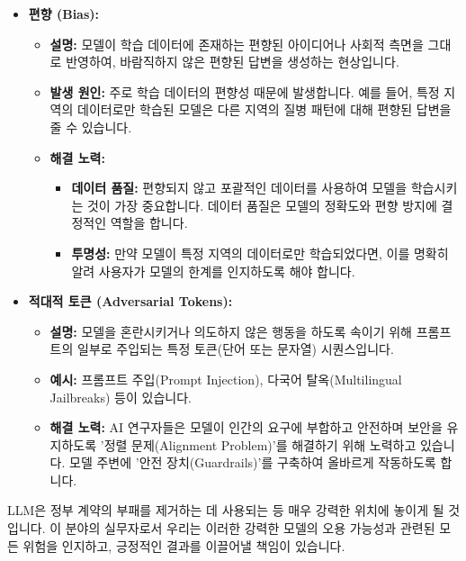 \documentclass[11pt,a4paper]{article}
\theoremstyle{definition}
\begin{document}
\begin{itemize}
    \item \textbf{편향 (Bias):}
    \begin{itemize}
        \item \textbf{설명:} 모델이 학습 데이터에 존재하는 편향된 아이디어나 사회적 측면을 그대로 반영하여, 바람직하지 않은 편향된 답변을 생성하는 현상입니다.
        \item \textbf{발생 원인:} 주로 학습 데이터의 편향성 때문에 발생합니다. 예를 들어, 특정 지역의 데이터로만 학습된 모델은 다른 지역의 질병 패턴에 대해 편향된 답변을 줄 수 있습니다.
        \item \textbf{해결 노력:}
        \begin{itemize}
            \item \textbf{데이터 품질:} 편향되지 않고 포괄적인 데이터를 사용하여 모델을 학습시키는 것이 가장 중요합니다. 데이터 품질은 모델의 정확도와 편향 방지에 결정적인 역할을 합니다.
            \item \textbf{투명성:} 만약 모델이 특정 지역의 데이터로만 학습되었다면, 이를 명확히 알려 사용자가 모델의 한계를 인지하도록 해야 합니다.
        \end{itemize}
    \end{itemize}

    \item \textbf{적대적 토큰 (Adversarial Tokens):}
    \begin{itemize}
        \item \textbf{설명:} 모델을 혼란시키거나 의도하지 않은 행동을 하도록 속이기 위해 프롬프트의 일부로 주입되는 특정 토큰(단어 또는 문자열) 시퀀스입니다.
        \item \textbf{예시:} 프롬프트 주입(Prompt Injection), 다국어 탈옥(Multilingual Jailbreaks) 등이 있습니다.
        \item \textbf{해결 노력:} AI 연구자들은 모델이 인간의 요구에 부합하고 안전하며 보안을 유지하도록 '정렬 문제(Alignment Problem)'를 해결하기 위해 노력하고 있습니다. 모델 주변에 '안전 장치(Guardrails)'를 구축하여 올바르게 작동하도록 합니다.
    \end{itemize}
\end{itemize}

\begin{tcolorbox}[cautionbox={LLM의 강력함과 책임}]
    LLM은 정부 계약의 부패를 제거하는 데 사용되는 등 매우 강력한 위치에 놓이게 될 것입니다. 이 분야의 실무자로서 우리는 이러한 강력한 모델의 오용 가능성과 관련된 모든 위험을 인지하고, 긍정적인 결과를 이끌어낼 책임이 있습니다.
\end{tcolorbox}
\end{document}
